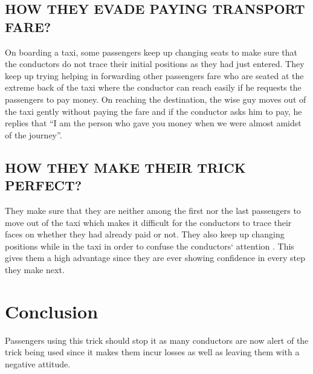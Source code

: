 \documentclass{article}
\begin{document}
\subsection{HOW THEY EVADE PAYING TRANSPORT FARE?}
{On boarding a taxi, some passengers keep up changing seats to make sure that the conductors do not trace their initial positions as they had just entered. They keep up trying helping in forwarding other passengers fare who are seated at the extreme back of the taxi where the conductor can reach easily if he requests the passengers to pay money. On reaching the destination, the wise guy moves out of the taxi gently without  paying the fare and if the conductor asks him to pay, he replies that “I am the person who gave you money when we were almost amidst of the journey”.}

\subsection{HOW THEY MAKE THEIR TRICK PERFECT?}
{They make sure that they are neither among the first nor the last passengers to move out of the taxi which makes it difficult for the conductors to trace their faces on whether they had already paid or not.
They also keep up changing positions while in the taxi in order to confuse the conductors` attention . This gives them a high advantage since they are ever showing  confidence in every step they make next.
}

\section{Conclusion}
{Passengers using this trick should stop it as many conductors are now alert of the trick being used since it makes them incur losses as well as leaving them with a negative attitude. }
\end{document}
